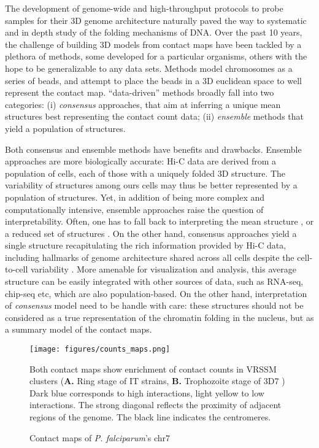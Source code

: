 \documentclass[2columns]{article}
\begin{document}
The development of genome-wide and high-throughput protocols to probe samples
for their 3D genome architecture naturally paved the way to systematic and in
depth study of the folding mechanisms of DNA. Over the past 10 years, the
challenge of building 3D models from contact maps have been tackled by a
plethora of methods, some developed for a particular organisms, others with
the hope to be generalizable to any data sets. Methods model chromosomes as a
series of beads, and attempt to place the beads in a 3D euclidean space to
well represent the contact map. ``data-driven'' methods broadly fall into two
categories: (i) \textit{consensus} approaches, that aim at inferring a unique
mean structures best representing the contact count data; (ii)
\textit{ensemble} methods that yield a population of structures.

Both consensus and ensemble methods have benefits and drawbacks. Ensemble
approaches are more biologically accurate: Hi-C data are derived from a
population of cells, each of those with a uniquely folded 3D structure. The
variability of structures among ours cells may thus be better represented by a
population of structures. Yet, in addition of being more complex and
computationally intensive, ensemble approaches raise the question of
interpretability. Often, one has to fall back to interpreting the mean
structure \citep{kalhor:genome}, or a reduced set of structures
\citep{rousseau:three}. On the other hand, consensus approaches yield a single
structure recapitulating the rich information provided by Hi-C data, including
hallmarks of genome architecture shared across all cells despite the
cell-to-cell variability \citep{nagano:single-cell}. More amenable for
visualization and analysis, this average structure can be easily integrated
with other sources of data, such as RNA-seq, chip-seq etc, which are also
population-based. On the other hand, interpretation of \textit{consensus}
model need to be handle with care: these structures should not be considered
as a true representation of the chromatin folding in the nucleus, but as a
summary model of the contact maps.

\begin{figure}
\begin{center}
\texttt{[image: figures/counts\_maps.png]}
\end{center}
\caption{Contact maps of {\em P. falciparum}'s chr7}{ \small Both contact maps show
enrichment of contact counts in VRSSM clusters (\textbf{A.} Ring stage 
\citep{lemieux:genome-wide} of IT strains, \textbf{B.} 
Trophozoite stage of 3D7 \citep{ay:three-dimensional}) 
Dark blue corresponds to high interactions, light yellow to low interactions.
The strong diagonal reflects the proximity of adjacent regions of the genome.
The black line indicates the centromeres. }
\end{figure}
\end{document}
